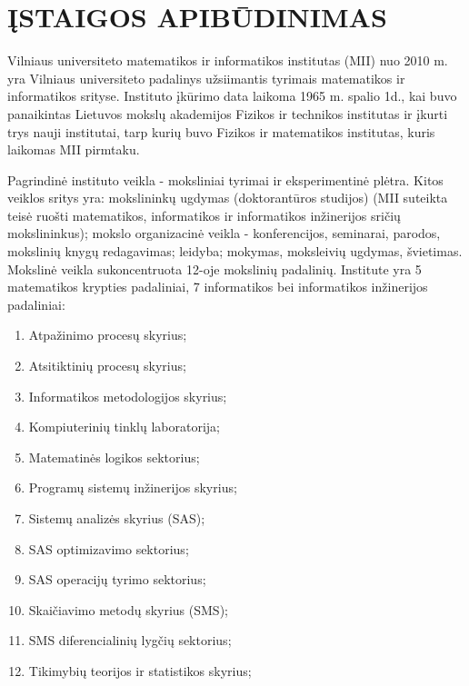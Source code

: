
\section{ĮSTAIGOS APIBŪDINIMAS}
\label{imones_apibudinimas}

Vilniaus universiteto matematikos ir informatikos institutas (MII) nuo 2010 m. yra Vilniaus universiteto padalinys užsiimantis tyrimais matematikos ir informatikos srityse. Instituto įkūrimo data laikoma 1965 m. spalio 1d., kai buvo panaikintas Lietuvos mokslų akademijos Fizikos ir technikos institutas ir įkurti trys nauji institutai, tarp kurių buvo Fizikos ir matematikos institutas, kuris laikomas MII pirmtaku. 

Pagrindinė instituto veikla - moksliniai tyrimai ir eksperimentinė plėtra. Kitos veiklos sritys yra: mokslininkų ugdymas (doktorantūros studijos) (MII suteikta teisė ruošti matematikos, informatikos ir informatikos inžinerijos sričių mokslininkus); mokslo organizacinė veikla - konferencijos, seminarai, parodos, mokslinių knygų redagavimas; leidyba; mokymas, moksleivių ugdymas, švietimas. Mokslinė veikla sukoncentruota 12-oje mokslinių padalinių. Institute yra 5 matematikos krypties padaliniai, 7 informatikos bei informatikos inžinerijos padaliniai:
\begin{enumerate}
  \item Atpažinimo procesų skyrius;
  \item Atsitiktinių procesų skyrius;
  \item Informatikos metodologijos skyrius;
  \item Kompiuterinių tinklų laboratorija;
  \item Matematinės logikos sektorius;
  \item Programų sistemų inžinerijos skyrius;
  \item Sistemų analizės skyrius (SAS);
  \item SAS optimizavimo sektorius;
  \item SAS operacijų tyrimo sektorius;
  \item Skaičiavimo metodų skyrius (SMS);
  \item SMS diferencialinių lygčių sektorius;
  \item Tikimybių teorijos ir statistikos skyrius;
\end{enumerate}

